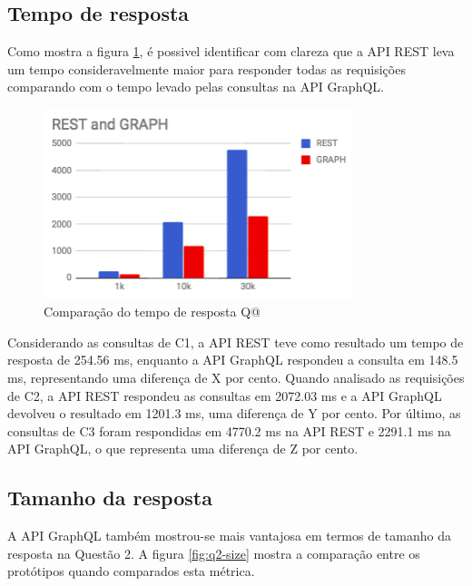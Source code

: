 \subsection{Tempo de resposta}

Como mostra a figura \ref{fig:q2-time}, é possivel identificar com clareza que a API REST leva um tempo consideravelmente maior para responder todas as requisições comparando com o tempo levado pelas consultas na API GraphQL.

\begin{figure}[htbp]
    \centering
    \includegraphics[width=0.8\textwidth]{figuras/Q2-result-request-time.png}
    \caption{Comparação do tempo de resposta Q@}
    \label{fig:q2-time}
    \author{fonte: Autor}
\end{figure}

Considerando as consultas de C1, a API REST teve como resultado um tempo de resposta de 254.56 ms, enquanto a API GraphQL respondeu a consulta em 148.5 ms, representando uma diferença de X por cento. Quando analisado as requisições de C2, a API REST respondeu as consultas em 2072.03 ms e a API GraphQL devolveu o resultado em 1201.3 ms, uma diferença de Y por cento. Por último, as consultas de C3 foram respondidas em 4770.2 ms na API REST e 2291.1 ms na API GraphQL, o que representa uma diferença de Z por cento.

\subsection{Tamanho da resposta}

A API GraphQL também mostrou-se mais vantajosa em termos de tamanho da resposta na Questão 2. A figura \ref{fig:q2-size} mostra a comparação entre os protótipos quando comparados esta métrica.

